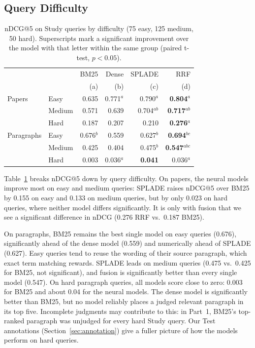 \documentclass[sigconf,nonacm]{acmart}
\begin{document}
\subsection{Query Difficulty}
\label{sec:difficulty}
\begin{table}[h]
  \caption{nDCG@5 on Study queries by difficulty (75 easy, 125 medium,
    50 hard). Superscripts mark a significant improvement over the model
    with that letter within the same group (paired t-test, $p < 0.05$).}
  \label{tab:difficulty}
  \small
  \begin{tabular}{llrrrr}
    \toprule
    & & BM25 & Dense & SPLADE & RRF \\
    & & (a) & (b) & (c) & (d) \\
    \midrule
    Papers     & Easy   & 0.635 & 0.771$^{a}$ & 0.790$^{a}$ & \textbf{0.804}$^{a}$ \\
               & Medium & 0.571 & 0.639 & 0.704$^{ab}$ & \textbf{0.717}$^{ab}$ \\
               & Hard   & 0.187 & 0.207 & 0.210 & \textbf{0.276}$^{a}$ \\
    \midrule
    Paragraphs & Easy   & 0.676$^{b}$ & 0.559 & 0.627$^{b}$ & \textbf{0.694}$^{bc}$ \\
               & Medium & 0.425 & 0.404 & 0.475$^{b}$ & \textbf{0.547}$^{abc}$ \\
               & Hard   & 0.003 & 0.036$^{a}$ & \textbf{0.041} & 0.036$^{a}$ \\
    \bottomrule
  \end{tabular}
\end{table}
Table~\ref{tab:difficulty} breaks nDCG@5 down by query difficulty. On papers, the 
neural models improve most on easy and medium queries: SPLADE raises 
nDCG@5 over BM25 by 0.155 on easy and 0.133 on medium queries, but by 
only 0.023 on hard queries, where neither model differs significantly. It is only 
with fusion that we see a significant difference in nDCG (0.276 RRF vs.\ 0.187 BM25).

On paragraphs, BM25 remains the best single model on easy queries (0.676), 
significantly ahead of the dense model (0.559) and numerically ahead of SPLADE 
(0.627). Easy queries tend to reuse the wording of their source paragraph, which 
exact term matching rewards. SPLADE leads on medium queries (0.475 vs.\ 0.425 for 
BM25, not significant), and fusion is significantly better than every single model 
(0.547). On hard paragraph queries, all models score close to zero: 0.003 for BM25 
and about 0.04 for the neural models. The dense model is significantly better than BM25, 
but no model reliably places a judged relevant paragraph in its top five. Incomplete 
judgments may contribute to this: in Part~1, BM25's top-ranked paragraph was unjudged 
for every hard Study query. Our Test annotations (Section~\ref{sec:annotation}) 
give a fuller picture of how the models perform on hard queries.
\end{document}
